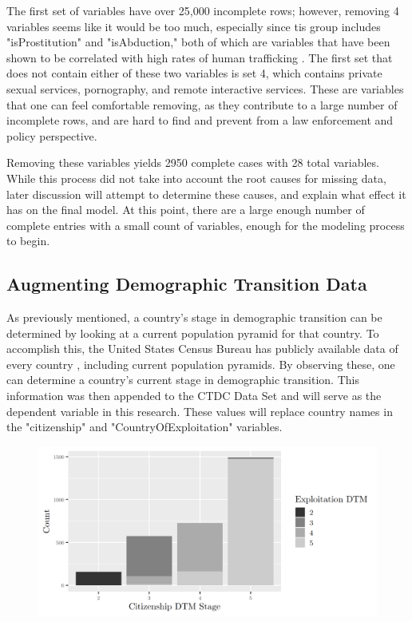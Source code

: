 \documentclass{article} %
\begin{document}
The first set of variables have over 25,000 incomplete rows; however, removing 4 variables seems like it would be too much, especially since tis group includes "isProstitution" and "isAbduction," both of which are variables that have been shown to be correlated with high rates of human trafficking \parencite{SlaveBook, polarisTypology}. The first set that does not contain either of these two variables is set 4, which contains private sexual services, pornography, and remote interactive services. These are variables that one can feel comfortable removing, as they contribute to a large number of incomplete rows, and are hard to find and prevent from a law enforcement and policy perspective.

Removing these variables yields 2950 complete cases with 28 total variables. While this process did not take into account the root causes for missing data, later discussion will attempt to determine these causes, and explain what effect it has on the final model. At this point, there are a large enough number of complete entries with a small count of variables, enough for the modeling process to begin.

\subsection{Augmenting Demographic Transition Data}

As previously mentioned, a country's stage in demographic transition can be determined by looking at a current population pyramid for that country. To accomplish this, the United States Census Bureau has publicly available data of every country \parencite{USCB}, including current population pyramids. By observing these, one can determine a country's current stage in demographic transition. This information was then appended to the CTDC Data Set and will serve as the dependent variable in this research. These values will replace country names in the "citizenship" and "CountryOfExploitation" variables.

\begin{figure}[H]
	\includegraphics[width = \textwidth]{DTMStage1}
\end{figure}




\printbibliography
\end{document}
